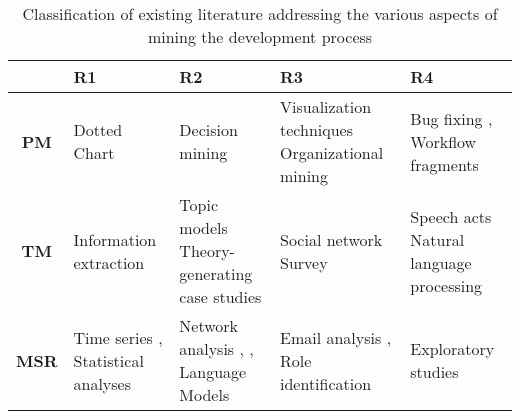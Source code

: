 \begin{table}[]
\centering
\caption{Classification of existing literature addressing the various aspects of mining the development process}
\label{table:literature-classification}
\begin{tabular}{@{}c>{\raggedright}m{3cm}>{\raggedright}m{2.5cm}>{\raggedright}m{2.5cm}>{\raggedright\arraybackslash}m{2.5cm}@{}}
\toprule
\multicolumn{1}{l}{} & \textbf{R1}                                              & \textbf{R2}                                                                                               & \textbf{R3} & \textbf{R4}                                      \\ \midrule

\textbf{PM} & Dotted Chart \citep{Song2007} & Decision mining \citep{Rozinat2006} & Visualization techniques \citep{Baumgrass2013} Organizational mining \citep{Song2008} \citep{Schonig2015} & Bug fixing \citep{Poncin2011a}, Workflow fragments \citep{kindler2006activity,kindler2006incremental} \\ \midrule
\textbf{TM} & Information extraction \citep{cowie1996information} & Topic models \citep{Chen2016a} Theory-generating case studies \citep{Lindberg2016} & Social network \citep{Bird2006} Survey \citep{Begel2010} \citep{DeA.R.Goncalves2010} & Speech acts \citep{DiCiccio2013a} \citep{Campos2018} Natural language processing \citep{Friedrich2011} \\ \midrule
\textbf{MSR} & Time series \citep{Ruohonen2015} \citep{Hou2014}, Statistical analyses \citep{Oliva2011} & Network analysis \citep{DAmbros2009}, \citep{Zimmermann2008}, Language Models \citep{Allamanis2013} & Email analysis \citep{Bird2006}, Role identification \citep{Yu.LiguoRamaswamy.2007} & Exploratory studies \citep{Gousios2014} \\ \bottomrule
\end{tabular}
\vspace*{-\baselineskip}
\end{table}